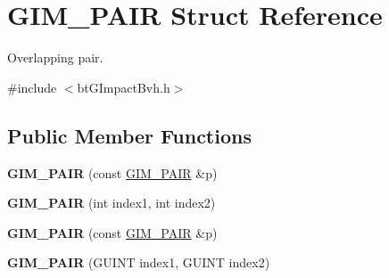 \hypertarget{struct_g_i_m___p_a_i_r}{\section{G\+I\+M\+\_\+\+P\+A\+I\+R Struct Reference}
\label{struct_g_i_m___p_a_i_r}
}


Overlapping pair.  




{\ttfamily \#include $<$bt\+G\+Impact\+Bvh.\+h$>$}

\subsection*{Public Member Functions}
\begin{DoxyCompactItemize}
\item 
\hypertarget{struct_g_i_m___p_a_i_r_ac2b1feaa0be24ed4bd4934dce7110bb6}{{\bfseries G\+I\+M\+\_\+\+P\+A\+I\+R} (const \hyperlink{struct_g_i_m___p_a_i_r}{G\+I\+M\+\_\+\+P\+A\+I\+R} \&p)}\label{struct_g_i_m___p_a_i_r_ac2b1feaa0be24ed4bd4934dce7110bb6}

\item 
\hypertarget{struct_g_i_m___p_a_i_r_aef2b03ca37fa350eee6ebb4980d24089}{{\bfseries G\+I\+M\+\_\+\+P\+A\+I\+R} (int index1, int index2)}\label{struct_g_i_m___p_a_i_r_aef2b03ca37fa350eee6ebb4980d24089}

\item 
\hypertarget{struct_g_i_m___p_a_i_r_ac2b1feaa0be24ed4bd4934dce7110bb6}{{\bfseries G\+I\+M\+\_\+\+P\+A\+I\+R} (const \hyperlink{struct_g_i_m___p_a_i_r}{G\+I\+M\+\_\+\+P\+A\+I\+R} \&p)}\label{struct_g_i_m___p_a_i_r_ac2b1feaa0be24ed4bd4934dce7110bb6}

\item 
\hypertarget{struct_g_i_m___p_a_i_r_ab8e524c274a40b5745e2329722911fa5}{{\bfseries G\+I\+M\+\_\+\+P\+A\+I\+R} (G\+U\+I\+N\+T index1, G\+U\+I\+N\+T index2)}\label{struct_g_i_m___p_a_i_r_ab8e524c274a40b5745e2329722911fa5}

\end{DoxyCompactItemize}
